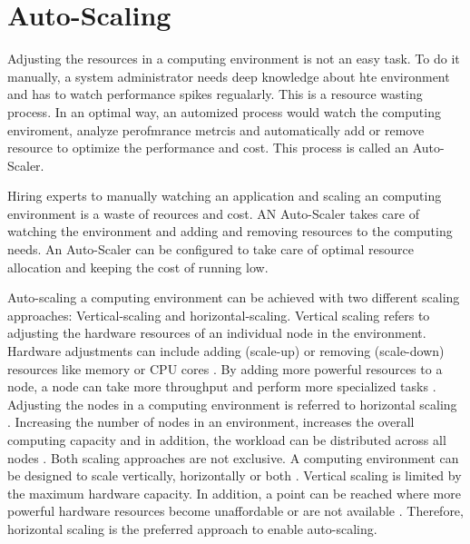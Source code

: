 \section{Auto-Scaling}
Adjusting the resources in a computing environment is not an easy task. To do it manually, a system administrator needs deep knowledge about hte environment and has to watch performance spikes regualarly. This is a resource wasting process. In an optimal way, an automized process would watch the computing enviroment, analyze perofmrance metrcis and automatically add or remove resource to optimize the performance and cost. This process is called an Auto-Scaler.


Hiring experts to manually watching an application and scaling an computing environment is a waste of reources and cost.
AN Auto-Scaler takes care of watching the environment and adding and removing resources to the computing needs. An Auto-Scaler can be configured to take care of optimal resource allocation and keeping the cost of running low.


Auto-scaling a computing environment can be achieved with two different scaling approaches: Vertical-scaling and horizontal-scaling.
Vertical scaling refers to adjusting the hardware resources of an individual node in the environment. Hardware adjustments can include adding (scale-up) or removing (scale-down) resources like memory or CPU cores \cite{Wilder2012CloudPatterns}. By adding more powerful resources to a node, a node can take more throughput and perform more specialized tasks \cite{Abbott2015ScalabilityArt}.
Adjusting the nodes in a computing environment is referred to horizontal scaling \cite{Wilder2012CloudPatterns}. Increasing the number of nodes in an environment, increases the overall computing capacity and in addition, the workload can be distributed across all nodes \cite{Wilder2012CloudPatterns, Abbott2015ScalabilityArt}.
Both scaling approaches are not exclusive. A computing environment can be designed to scale vertically, horizontally or both \cite{Wilder2012CloudPatterns}.
Vertical scaling is limited by the maximum hardware capacity. In addition, a point can be reached where more powerful hardware resources become unaffordable or are not available \cite{Abbot2011ScalabilityRules}.  Therefore, horizontal scaling is the preferred approach to enable auto-scaling.


